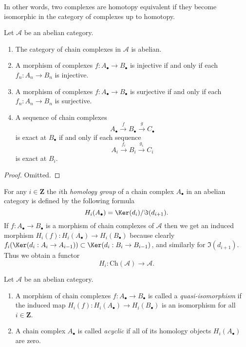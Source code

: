 \noindent
In other words, two complexes are homotopy equivalent if they become
isomorphic in the category of complexes up to homotopy.

\begin{lemma}
\label{lemma-cat-chain-abelian}
Let $\mathcal{A}$ be an abelian category.
\begin{enumerate}
\item The category of chain complexes in $\mathcal{A}$ is
abelian.
\item A morphism of complexes
$f : A_\bullet \to B_\bullet$ is injective
if and only if each $f_n : A_n \to B_n$ is injective.
\item A morphism of complexes
$f : A_\bullet \to B_\bullet$ is surjective
if and only if each $f_n : A_n \to B_n$ is surjective.
\item A sequence of chain complexes
$$
A_\bullet \xrightarrow{f} B_\bullet \xrightarrow{g} C_\bullet
$$
is exact at $B_\bullet$ if and only if each sequence
$$
A_i \xrightarrow{f_i} B_i \xrightarrow{g_i} C_i
$$
is exact at $B_i$.
\end{enumerate}
\end{lemma}

\begin{proof}
Omitted.
\end{proof}

\noindent
For any $i \in \mathbf{Z}$ the $i$th {\it homology group}
of a chain complex $A_\bullet$ in an abelian category is defined by
the following formula
$$
H_i(A_\bullet) = \Ker(d_i)/\Im(d_{i + 1}).
$$
If $f : A_\bullet \to B_\bullet$ is a morphism of chain
complexes of $\mathcal{A}$ then we get an induced
morphism $H_i(f) : H_i(A_\bullet) \to H_i(B_\bullet)$
because clearly
$f_i(\Ker(d_i : A_i \to A_{i - 1})) \subset
\Ker(d_i : B_i \to B_{i - 1})$, and similarly
for $\Im(d_{i + 1})$.
Thus we obtain a functor
$$
H_i : \text{Ch}(\mathcal{A}) \longrightarrow \mathcal{A}.
$$

\begin{definition}
\label{definition-quasi-isomorphism}
Let $\mathcal{A}$ be an abelian category.
\begin{enumerate}
\item A morphism of chain complexes $f : A_\bullet \to B_\bullet$
is called a {\it quasi-isomorphism} if the induced
map $H_i(f) : H_i(A_\bullet) \to H_i(B_\bullet)$
is an isomorphism for all $i \in \mathbf{Z}$.
\item A chain complex $A_\bullet$ is called
{\it acyclic} if all of its homology objects
$H_i(A_\bullet)$ are zero.
\end{enumerate}
\end{definition}


